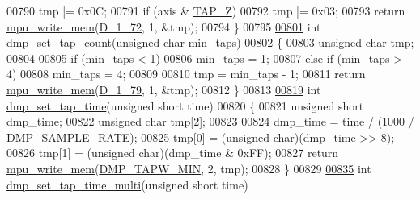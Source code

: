 \begin{DoxyCode}
00790         tmp |= 0x0C;
00791     \textcolor{keywordflow}{if} (axis & \hyperlink{group___d_r_i_v_e_r_s_gac2949c36d5f4eeb4769fdcf2d99284fd}{TAP\_Z})
00792         tmp |= 0x03;
00793     \textcolor{keywordflow}{return} \hyperlink{group___d_r_i_v_e_r_s_gafea59910bc3dd30ba3356b1c75213a5f}{mpu\_write\_mem}(\hyperlink{group___d_r_i_v_e_r_s_ga065f93eacb4dcc7020cc21146e533110}{D\_1\_72}, 1, &tmp);
00794 \}
00795 
\hypertarget{inv__mpu__dmp__motion__driver_8c_source.tex_l00801}{}\hyperlink{group___d_r_i_v_e_r_s_ga819f947b2cb107ada7b9a94c41be0dad}{00801} \textcolor{keywordtype}{int} \hyperlink{group___d_r_i_v_e_r_s_ga819f947b2cb107ada7b9a94c41be0dad}{dmp\_set\_tap\_count}(\textcolor{keywordtype}{unsigned} \textcolor{keywordtype}{char} min\_taps)
00802 \{
00803     \textcolor{keywordtype}{unsigned} \textcolor{keywordtype}{char} tmp;
00804 
00805     \textcolor{keywordflow}{if} (min\_taps < 1)
00806         min\_taps = 1;
00807     \textcolor{keywordflow}{else} \textcolor{keywordflow}{if} (min\_taps > 4)
00808         min\_taps = 4;
00809 
00810     tmp = min\_taps - 1;
00811     \textcolor{keywordflow}{return} \hyperlink{group___d_r_i_v_e_r_s_gafea59910bc3dd30ba3356b1c75213a5f}{mpu\_write\_mem}(\hyperlink{group___d_r_i_v_e_r_s_gae6ba99808ab9bc8eaddbc7c7cc6af1f3}{D\_1\_79}, 1, &tmp);
00812 \}
00813 
\hypertarget{inv__mpu__dmp__motion__driver_8c_source.tex_l00819}{}\hyperlink{group___d_r_i_v_e_r_s_ga97466067f4a23368f4d7e2547fe359d9}{00819} \textcolor{keywordtype}{int} \hyperlink{group___d_r_i_v_e_r_s_ga97466067f4a23368f4d7e2547fe359d9}{dmp\_set\_tap\_time}(\textcolor{keywordtype}{unsigned} \textcolor{keywordtype}{short} time)
00820 \{
00821     \textcolor{keywordtype}{unsigned} \textcolor{keywordtype}{short} dmp\_time;
00822     \textcolor{keywordtype}{unsigned} \textcolor{keywordtype}{char} tmp[2];
00823 
00824     dmp\_time = time / (1000 / \hyperlink{group___d_r_i_v_e_r_s_ga9d0f0425cbcb58186500cb8686e41e67}{DMP\_SAMPLE\_RATE});
00825     tmp[0] = (\textcolor{keywordtype}{unsigned} char)(dmp\_time >> 8);
00826     tmp[1] = (\textcolor{keywordtype}{unsigned} char)(dmp\_time & 0xFF);
00827     \textcolor{keywordflow}{return} \hyperlink{group___d_r_i_v_e_r_s_gafea59910bc3dd30ba3356b1c75213a5f}{mpu\_write\_mem}(\hyperlink{dmpmap_8h_ad1ab58d13c100d9413f61df40d52f95f}{DMP\_TAPW\_MIN}, 2, tmp);
00828 \}
00829 
\hypertarget{inv__mpu__dmp__motion__driver_8c_source.tex_l00835}{}\hyperlink{group___d_r_i_v_e_r_s_gaeca250a90eb816eb2609229849481337}{00835} \textcolor{keywordtype}{int} \hyperlink{group___d_r_i_v_e_r_s_gaeca250a90eb816eb2609229849481337}{dmp\_set\_tap\_time\_multi}(\textcolor{keywordtype}{unsigned} \textcolor{keywordtype}{short} time)

\end{DoxyCode}
